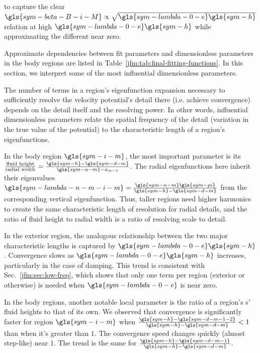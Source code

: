 \documentclass[ASNA,twocolumn]{USG} %
\begin{document}
\begin{table}
{    to capture the clear $\gls{sym-beta-B-i-M} \propto \sqrt{\gls{sym-lambda-0-e} \gls{sym-h}}$ relation at high $\gls{sym-lambda-0-e} \gls{sym-h}$ while approximating the different \behaviour{} near zero.
    }
    \label{jfm:tab:final-fitting-functions}\end{table}
Approximate dependencies between fit parameters and dimensionless parameters in the body regions are listed in Table~\ref{jfm:tab:final-fitting-functions}.
In this section, we interpret some of the most influential dimensionless parameters.

The number of terms in a region's eigenfunction expansion necessary to sufficiently resolve the velocity potential's detail there (i.e. achieve convergence) depends on the detail itself and the resolving power.
In other words, influential dimensionless parameters relate the spatial frequency of the detail (variation in the true value of the potential) to the characteristic length of a region's eigenfunctions.

In the body region $\gls{sym-i-m}$, the most important parameter is its $\frac{\text{fluid height}}{\text{radial width}} = \frac{\gls{sym-h} - \gls{sym-d-m}}{\gls{sym-a-m} - a_{{m-1}}}$.
The radial eigenfunctions here inherit their eigenvalues $\gls{sym-lambda-n-m-i-m} = \frac{\gls{sym-n-m}\gls{sym-pi}}{\gls{sym-h}-\gls{sym-d-m}}$ from the corresponding vertical eigenfunction.
Thus, taller regions need higher harmonics to create the same characteristic length of resolution for radial details, and the ratio of fluid height to radial width is a ratio of resolving scale to detail.

In the exterior region, the analogous relationship between the two major characteristic lengths is captured by $\gls{sym-lambda-0-e}\gls{sym-h}$.
Convergence slows as $\gls{sym-lambda-0-e}\gls{sym-h}$ increases, particularly in the case of damping.
This trend is consistent with Sec.~\ref{jfm:sec:low-freq}, which shows that only one term per region (exterior or otherwise) is needed when $\gls{sym-lambda-0-e}$ is near zero.

In the body regions, another notable local parameter is the ratio of a region's \neighbour{}s' fluid heights to that of its own.
We observed that convergence is significantly faster for region $\gls{sym-i-m}$ when $\frac{\gls{sym-h}-\gls{sym-d-m-1-2}}{\gls{sym-h}-\gls{sym-d-m}} < 1$ than when it's greater than $1$.
The convergence speed changes quickly (almost step-like) near $1$.
The trend is the same for $\frac{\gls{sym-h}-\gls{sym-d-m-1}}{\gls{sym-h}-\gls{sym-d-m}}$.
\end{document}
